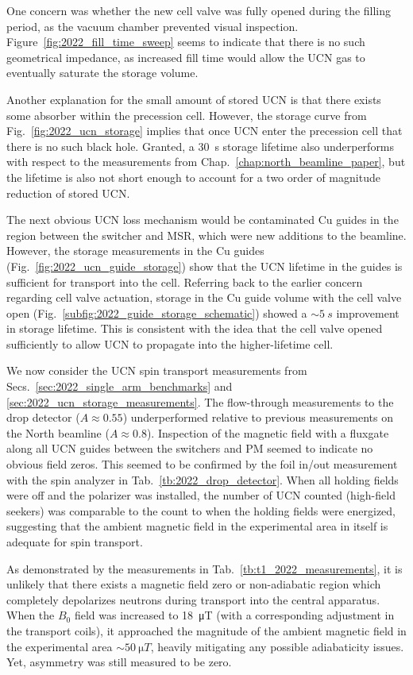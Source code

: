 One concern was whether the new cell valve was fully opened during the filling period, as the vacuum chamber prevented visual inspection. Figure~\ref{fig:2022_fill_time_sweep} seems to indicate that there is no such geometrical impedance, as increased fill time would allow the UCN gas to eventually saturate the storage volume.

Another explanation for the small amount of stored UCN is that there exists some absorber within the precession cell. However, the storage curve from Fig.~\ref{fig:2022_ucn_storage} implies that once UCN enter the precession cell that there is no such black hole. Granted, a \qty{30}{s} storage lifetime also underperforms with respect to the measurements from Chap.~\ref{chap:north_beamline_paper}, but the lifetime is also not short enough to account for a two order of magnitude reduction of stored UCN.

The next obvious UCN loss mechanism would be contaminated Cu guides in the region between the switcher and MSR, which were new additions to the beamline. However, the storage measurements in the Cu guides  (Fig.~\ref{fig:2022_ucn_guide_storage}) show that the UCN lifetime in the guides is sufficient for transport into the cell. Referring back to the earlier concern regarding cell valve actuation, storage in the Cu guide volume with the cell valve open (Fig.~\ref{subfig:2022_guide_storage_schematic}) showed a $\sim \qty{5}{s}$ improvement in storage lifetime. This is consistent with the idea that the cell valve opened sufficiently to allow UCN to propagate into the higher-lifetime cell.

We now consider the UCN spin transport measurements from Secs.~\ref{sec:2022_single_arm_benchmarks} and \ref{sec:2022_ucn_storage_measurements}. The flow-through measurements to the drop detector ($A\approx 0.55$) underperformed relative to previous measurements on the North beamline  ($A\approx 0.8$). Inspection of the magnetic field with a fluxgate along all UCN guides between the switchers and PM seemed to indicate no obvious field zeros. This seemed to be confirmed by the foil in/out measurement with the spin analyzer in Tab.~\ref{tb:2022_drop_detector}. When all holding fields were off and the polarizer was installed, the number of UCN counted (high-field seekers) was comparable to the count to when the holding fields were energized, suggesting that the ambient magnetic field in the experimental area in itself is adequate for spin transport.

As demonstrated by the measurements in Tab.~\ref{tb:t1_2022_measurements}, it is unlikely that there exists a magnetic field zero or non-adiabatic region which completely depolarizes neutrons during transport into the central apparatus. When the $B_0$ field was increased to \qty{18}{\micro T} (with a corresponding adjustment in the transport coils), it approached the magnitude of the ambient magnetic field in the experimental area $\sim\qty{50}{\micro T}$, heavily mitigating any possible adiabaticity issues. Yet, asymmetry was still measured to be zero.

